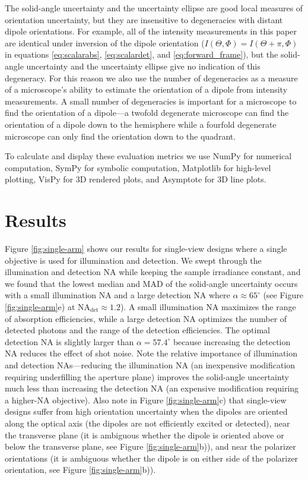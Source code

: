 \documentclass[10pt]{article}
\begin{document}
The solid-angle uncertainty and the uncertainty ellipse are good local measures
of orientation uncertainty, but they are insensitive to degeneracies with
distant dipole orientations. For example, all of the intensity measurements in
this paper are identical under inversion of the dipole orientation
($I(\Theta, \Phi) = I(\Theta + \pi, \Phi)$ in equations \ref{eq:scalarabs},
\ref{eq:scalardet}, and \ref{eq:forward_frame}), but the solid-angle uncertainty
and the uncertainty ellipse give no indication of this degeneracy. For this
reason we also use the number of degeneracies as a measure of a microscope's
ability to estimate the orientation of a dipole from intensity measurements. A
small number of degeneracies is important for a microscope to find the
orientation of a dipole---a twofold degenerate microscope can find the
orientation of a dipole down to the hemisphere while a fourfold degenerate
microscope can only find the orientation down to the quadrant.

To calculate and display these evaluation metrics we use NumPy \cite{walt2011}
for numerical computation, SymPy \cite{meurer2017} for symbolic computation,
Matplotlib \cite{hunter2007} for high-level plotting, VisPy \cite{vispy} for 3D
rendered plots, and Asymptote \cite{bowman2008} for 3D line plots.

\section{Results}\label{results}
Figure \ref{fig:single-arm} shows our results for single-view designs where a
single objective is used for illumination and detection. We swept through the
illumination and detection NA while keeping the sample irradiance constant, and
we found that the lowest median and MAD of the solid-angle uncertainty occurs
with a small illumination NA and a large detection NA where
$\alpha \approx 65^{\circ}$ (see Figure \ref{fig:single-arm}e) at
NA${}_{\text{det}} \approx 1.2$). A small illumination NA maximizes the range of
absorption efficiencies, while a large detection NA optimizes the number of
detected photons and the range of the detection efficiencies. The optimal
detection NA is slightly larger than $\alpha = 57.4^{\circ}$ because increasing
the detection NA reduces the effect of shot noise. Note the relative importance
of illumination and detection NAs---reducing the illumination NA (an inexpensive
modification requiring underfilling the aperture plane) improves the solid-angle
uncertainty much less than increasing the detection NA (an expensive
modification requiring a higher-NA objective). Also note in Figure
\ref{fig:single-arm}c) that single-view designs suffer from high orientation
uncertainty when the dipoles are oriented along the optical axis (the
dipoles are not efficiently excited or detected), near the transverse plane
(it is ambiguous whether the dipole is oriented above or below the transverse
plane, see Figure \ref{fig:single-arm}b)), and near the polarizer orientations
(it is ambiguous whether the dipole is on either side of the polarizer
orientation, see Figure \ref{fig:single-arm}b)).
\end{document}
